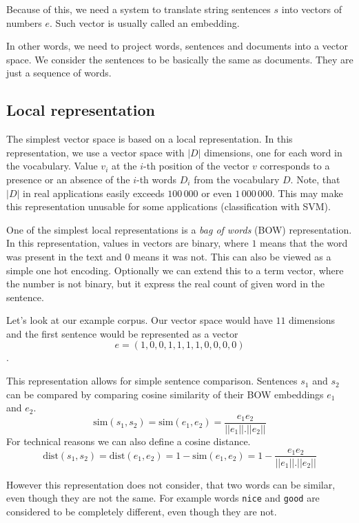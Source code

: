     Because of this, we need a system to translate string sentences $s$ into vectors of numbers $e$.
    Such vector is usually called an embedding. 
    
    In  other words, we need to project words, sentences and documents into a vector space.
    We consider the sentences to be basically the same as documents. 
    They are just a sequence of words.
    
    \subsection{Local representation} \label{sec:local:representation}
    
    The simplest vector space is based on a local representation.
    In this representation, we use a vector space with $|D|$ dimensions, one for each word in the vocabulary.
    Value $v_i$ at the $i$-th position of the vector $v$ corresponds to a presence or an absence of the $i$-th words $D_i$ from the vocabulary $D$.
    Note, that $|D|$ in real applications easily exceeds $100\,000$ or even $1\,000\,000$.
    This may make this representation unusable for some applications (classification with SVM).
    
    One of the simplest local representations is a \textit{bag of words} (BOW) representation. 
    In this representation, values in vectors are binary, where $1$ means that the word was present in the text and $0$ means it was not.
    This can also be viewed as a simple one hot encoding.
    Optionally we can extend this to a term vector, where the number is not binary, but it express the real count of given word in the sentence.
    
    Let's look at our example corpus. 
    Our vector space would have $11$ dimensions and the first sentence would be represented as a vector
    $$e = (1, 0, 0, 1, 1, 1, 1, 0, 0, 0, 0)$$.
    
    This representation allows for simple sentence comparison. 
    Sentences $s_1$ and $s_2$ can be compared by comparing cosine similarity of their BOW embeddings $e_1$ and $e_2$.
    $$\mathrm{sim}(s_1, s_2) = \mathrm{sim}(e_1, e_2) = \frac{e_1 e_2}{||e_1||.||e_2||}$$
    For technical reasons we can also define a cosine distance. 
    $$\mathrm{dist}(s_1, s_2) = \mathrm{dist}(e_1, e_2) = 1- \mathrm{sim}(e_1, e_2) = 1 - \frac{e_1 e_2}{||e_1||.||e_2||}$$
    
    However this representation does not consider, that two words can be similar, even though they are not the same.
    For example words \texttt{nice} and \texttt{good} are considered to be completely different, even though they are not. 
    
